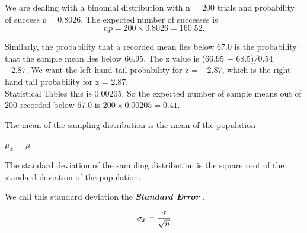 We are dealing with a binomial distribution with n = 200 trials and
probability of success $p = 0.8026$. The expected number of successes is
\[np = 200 × 0.8026 = 160.52.\]


Similarly, the probability that a recorded mean lies below 67.0 is the probability
that the sample mean lies below 66.95. The z value is (66.95 − 68.5)/0.54 =
−2.87. We want the left-hand tail probability for z = −2.87, which is the
right-hand tail probability for z = 2.87. \\  Statistical Tables this is 0.00205. So the expected number of sample means out
of 200 recorded below 67.0 is $200 \times 0.00205 = 0.41$.


{

The mean of the sampling distribution is the mean of the population

$\mu_{\bar{x}}$ = $\mu$

The standard deviation of the sampling distribution is the square root of the standard deviation of the population.


We call this standard deviation the \textbf{\emph{Standard Error}} .

\[ \sigma_{\bar{x}} = {\sigma \over\sqrt{ n} }\]
}

